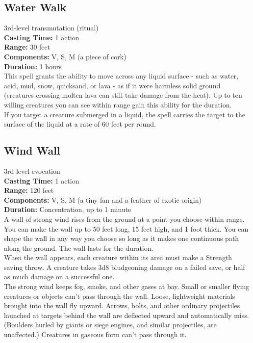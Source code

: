 \documentclass[11pt, A4paper, english]{article}
\begin{document}
		\subsection{Water Walk}
3rd-level transmutation (ritual) \\
\textbf{Casting Time:} 1 action \\
\textbf{Range:} 30 feet \\
\textbf{Components:} V, S, M (a piece of cork) \\
\textbf{Duration:} 1 hours \\
This spell grants the ability to move across any liquid surface - such as water, acid, mud, snow, quicksand, or lava - as if it were harmless solid ground (creatures crossing molten lava can still take damage from the heat). Up to ten willing creatures you can see within range gain this ability for the duration. \\
If you target a creature submerged in a liquid, the spell carries the target to the surface of the liquid at a rate of 60 feet per round.

		\subsection{Wind Wall}
3rd-level evocation \\
\textbf{Casting Time:} 1 action \\
\textbf{Range:} 120 feet \\
\textbf{Components:} V, S, M (a tiny fan and a feather of exotic origin) \\
\textbf{Duration:} Concentration, up to 1 minute \\
A wall of strong wind rises from the ground at a point you choose within range. You can make the wall up to 50 feet long, 15 feet high, and 1 foot thick. You can shape the wall in any way you choose so long as it makes one continuous path along the ground. The wall lasts for the duration. \\
When the wall appears, each creature within its area must make a Strength saving throw. A creature takes 3d8 bludgeoning damage on a failed save, or half as much damage on a successful one. \\
The strong wind keeps fog, smoke, and other gases at bay. Small or smaller flying creatures or objects can’t pass through the wall. Loose, lightweight materials brought into the wall fly upward. Arrows, bolts, and other ordinary projectiles launched at targets behind the wall are deflected upward and automatically miss. (Boulders hurled by giants or siege engines, and similar projectiles, are unaffected.) Creatures in gaseous form can’t pass through it.
\end{document}
